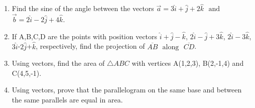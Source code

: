 \documentclass{article}
\begin{document}
\begin{enumerate}
\item Find the sine of the angle between the vectors $\vec{a}=3\hat{i}+\hat{j}+2\hat{k}$ $\text{ and }$ $\vec{b}=2\hat{i}-2\hat{j}+4\hat{k}$.


\item If A,B,C,D  are the points with position vectors $\hat{i}+\hat{j}-\hat{k}$, $2\hat{i}-\hat{j}+3\hat{k}$, $2\hat{i}-3\hat{k}$, $3\hat{i}$-$2\hat{j}$+$\hat{k}$, respectively, find the projection of $\overline{AB}$ $\text{ along }$ $\overline{CD}$.


\item Using vectors, find the area of $\triangle{ABC}$ with vertices A(1,2,3), B(2,-1,4) and C(4,5,-1).


\item Using vectors, prove that the parallelogram on the same base and between the same parallels are equal in area.
\end{enumerate}
\end{document}
